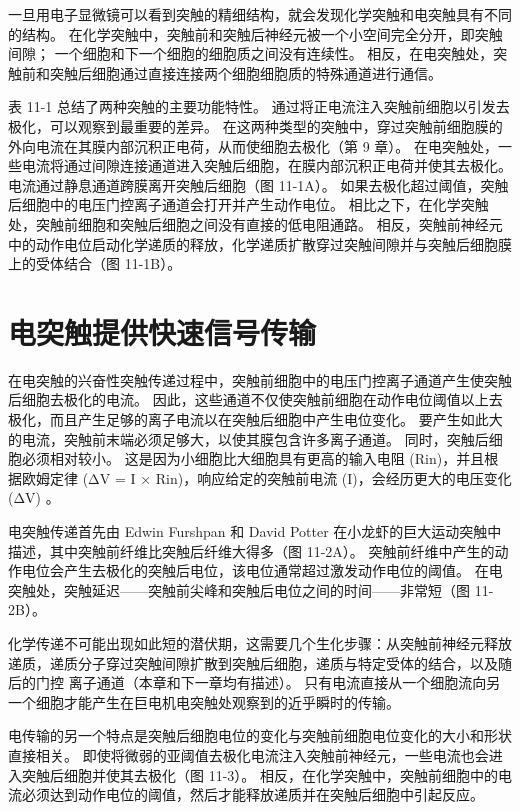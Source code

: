 一旦用电子显微镜可以看到突触的精细结构，就会发现化学突触和电突触具有不同的结构。 在化学突触中，突触前和突触后神经元被一个小空间完全分开，即突触间隙； 一个细胞和下一个细胞的细胞质之间没有连续性。 相反，在电突触处，突触前和突触后细胞通过直接连接两个细胞细胞质的特殊通道进行通信。

表 11-1 总结了两种突触的主要功能特性。 通过将正电流注入突触前细胞以引发去极化，可以观察到最重要的差异。 在这两种类型的突触中，穿过突触前细胞膜的外向电流在其膜内部沉积正电荷，从而使细胞去极化（第 9 章）。 在电突触处，一些电流将通过间隙连接通道进入突触后细胞，在膜内部沉积正电荷并使其去极化。 电流通过静息通道跨膜离开突触后细胞（图 11-1A）。 如果去极化超过阈值，突触后细胞中的电压门控离子通道会打开并产生动作电位。 相比之下，在化学突触处，突触前细胞和突触后细胞之间没有直接的低电阻通路。 相反，突触前神经元中的动作电位启动化学递质的释放，化学递质扩散穿过突触间隙并与突触后细胞膜上的受体结合（图 11-1B）。

\section{电突触提供快速信号传输}
在电突触的兴奋性突触传递过程中，突触前细胞中的电压门控离子通道产生使突触后细胞去极化的电流。 因此，这些通道不仅使突触前细胞在动作电位阈值以上去极化，而且产生足够的离子电流以在突触后细胞中产生电位变化。 要产生如此大的电流，突触前末端必须足够大，以使其膜包含许多离子通道。 同时，突触后细胞必须相对较小。 这是因为小细胞比大细胞具有更高的输入电阻 (Rin)，并且根据欧姆定律 (ΔV = I × Rin)，响应给定的突触前电流 (I)，会经历更大的电压变化 (ΔV) 。

电突触传递首先由 Edwin Furshpan 和 David Potter 在小龙虾的巨大运动突触中描述，其中突触前纤维比突触后纤维大得多（图 11-2A）。 突触前纤维中产生的动作电位会产生去极化的突触后电位，该电位通常超过激发动作电位的阈值。 在电突触处，突触延迟——突触前尖峰和突触后电位之间的时间——非常短（图 11-2B）。

化学传递不可能出现如此短的潜伏期，这需要几个生化步骤：从突触前神经元释放递质，递质分子穿过突触间隙扩散到突触后细胞，递质与特定受体的结合，以及随后的门控 离子通道（本章和下一章均有描述）。 只有电流直接从一个细胞流向另一个细胞才能产生在巨电机电突触处观察到的近乎瞬时的传输。

电传输的另一个特点是突触后细胞电位的变化与突触前细胞电位变化的大小和形状直接相关。 即使将微弱的亚阈值去极化电流注入突触前神经元，一些电流也会进入突触后细胞并使其去极化（图 11-3）。 相反，在化学突触中，突触前细胞中的电流必须达到动作电位的阈值，然后才能释放递质并在突触后细胞中引起反应。

